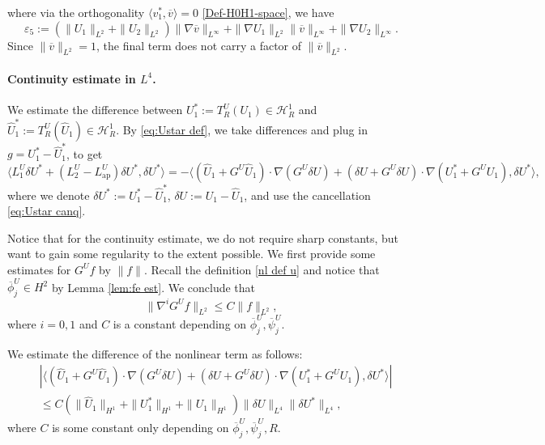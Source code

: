 \documentclass[11pt,a4paper]{article}
\numberwithin{equation}{section}
\newcommand{\assign}{:=}
\newcommand{\tmop}[1]{\ensuremath{\operatorname{#1}}}
\begin{document}
  where via the orthogonality $\langle v_1^{\ast},
   \overline{v} \rangle = 0$ \eqref{Def-H0H1-space}, we have 
  \begin{equation}
      \varepsilon_5 \assign (\| U_1 \|_{L^2} + \| U_2 \|_{L^2}) \| \nabla
     \overline{v} \|_{L^{\infty}} + \| \nabla U_1 \|_{L^2} \| \overline{v}
     \|_{L^{\infty}} + \| \nabla U_2 \|_{L^{\infty}} .\label{eq: eps5 def}
  \end{equation}
  Since $\| \overline{v} \|_{L^2} = 1$, the final term does not carry a factor
  of $\| \overline{v} \|_{L^2}$.


\paragraph{Continuity estimate in $L^4$.}
We estimate the difference between $U_1^{\ast}\assign T_R^U(U_1)\in\mathcal{H}^1_R$ and $\widehat{U}_1^{\ast}\assign T_R^U(\widehat{U}_1)\in\mathcal{H}^1_R$. By \eqref{eq:Ustar def}, we take differences and plug in $g=U_1^{\ast}-\widehat{U}_1^{\ast}$, to get
\begin{equation}
   \langle L_1^U \delta U^{\ast} + (L_2^U -
  L_{\tmop{ap}}^{U}) \delta U^{\ast}, \delta U^{\ast} \rangle =-\langle (\widehat{U}_1 + G^{U} \widehat{U}_1) \cdot \nabla (G^{U} \delta U) + ( \delta U + G^{U} \delta U ) \cdot
  \nabla (U_1^{\ast} + G^{U} U_1), \delta U^{\ast} \rangle ,\label{tu dif eqn}
\end{equation}
where we denote $\delta U^{\ast}\assign U_1^{\ast} - \widehat{U}_1^{\ast}$, $\delta U\assign U_1- \widehat{U}_1$, and use the cancellation \eqref{eq:Ustar canq}.

Notice that for the continuity estimate, we do not require sharp constants, but want to gain some regularity to the extent possible. We first provide some estimates for $G^{U}f$ by $\|f\|$. Recall the definition \eqref{nl def u} and notice that $\overline\phi^U_j\in H^2$ by Lemma \ref{lem:fe est}. 
We conclude that \begin{equation}
         \label{eq: reg gain}
\|\nabla^iG^{U}f\|_{L^2}\leqslant C\|f\|_{L^2},
     \end{equation}
     where $i=0,1$ and $C$ is a constant depending on $\overline\phi^U_j,\overline\psi^U_j$.

We estimate the difference of the nonlinear term as follows:
\begin{align}
  & | \langle (\widehat{U}_1 + G^{U} \widehat{U}_1) \cdot \nabla (G^{U} \delta U) + ( \delta U + G^{U} \delta U ) \cdot
  \nabla (U_1^{\ast} + G^{U} U_1), \delta U^{\ast} \rangle |  \label{eq:TU nonlin est1}\nonumber
  \\&\leqslant C(\|\widehat{U}_1\|_{H^1}+\|{U}_1^{\ast}  \|_{H^1}+\| {U}_1\|_{H^1})\|\delta U \|_{L^4}\|\delta U^{\ast} \|_{L^4},
\end{align}where $C$ is some constant only depending on $\overline\phi^U_j,\overline\psi^U_j,R$.
\end{document}
